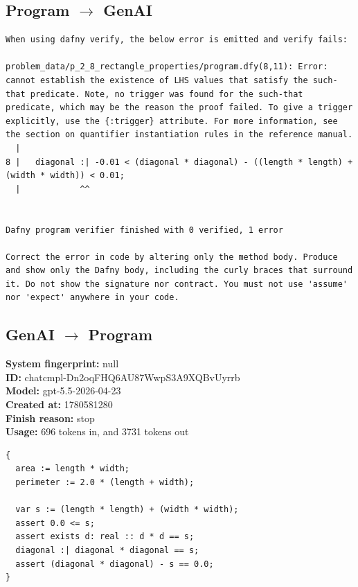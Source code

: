 \documentclass{article}
\begin{document}
\subsection*{Program $\rightarrow$ GenAI}
\begin{lstlisting}
When using dafny verify, the below error is emitted and verify fails:

problem_data/p_2_8_rectangle_properties/program.dfy(8,11): Error: cannot establish the existence of LHS values that satisfy the such-that predicate. Note, no trigger was found for the such-that predicate, which may be the reason the proof failed. To give a trigger explicitly, use the {:trigger} attribute. For more information, see the section on quantifier instantiation rules in the reference manual.
  |
8 |   diagonal :| -0.01 < (diagonal * diagonal) - ((length * length) + (width * width)) < 0.01;
  |            ^^


Dafny program verifier finished with 0 verified, 1 error

Correct the error in code by altering only the method body. Produce and show only the Dafny body, including the curly braces that surround it. Do not show the signature nor contract. You must not use 'assume' nor 'expect' anywhere in your code.
\end{lstlisting}
\subsection*{GenAI $\rightarrow$ Program}
\textbf{System fingerprint: }null
\\\textbf{ID: }chatcmpl-Dn2oqFHQ6AU87WwpS3A9XQBvUyrrb
\\\textbf{Model: }gpt-5.5-2026-04-23
\\\textbf{Created at: }1780581280
\\\textbf{Finish reason: }stop
\\\textbf{Usage: }696 tokens in, and 3731 tokens out
\begin{lstlisting}
{
  area := length * width;
  perimeter := 2.0 * (length + width);

  var s := (length * length) + (width * width);
  assert 0.0 <= s;
  assert exists d: real :: d * d == s;
  diagonal :| diagonal * diagonal == s;
  assert (diagonal * diagonal) - s == 0.0;
}
\end{lstlisting}
\end{document}
